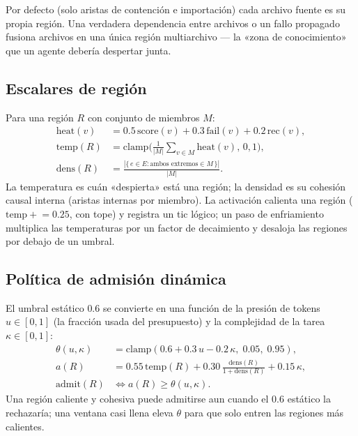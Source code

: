 \documentclass[11pt]{article}
\begin{document}
Por defecto (solo aristas de contención e importación) cada archivo fuente es su
propia región. Una verdadera dependencia entre archivos o un fallo propagado fusiona
archivos en una única región multiarchivo --- la «zona de conocimiento» que un agente
debería despertar junta.

\subsection{Escalares de región}

Para una región $R$ con conjunto de miembros $M$:
\begin{align}
\mathrm{heat}(v)        &= 0.5\,\mathrm{score}(v) + 0.3\,\mathrm{fail}(v) + 0.2\,\mathrm{rec}(v), \\
\mathrm{temp}(R)        &= \mathrm{clamp}\!\Big(\tfrac{1}{|M|}\textstyle\sum_{v\in M}\mathrm{heat}(v),\,0,1\Big), \label{eq:temp}\\
\mathrm{dens}(R)        &= \frac{|\{\,e\in E : \text{ambos extremos} \in M\,\}|}{|M|}. \label{eq:dens}
\end{align}
La temperatura es cuán «despierta» está una región; la densidad es su cohesión causal
interna (aristas internas por miembro). La activación calienta una región
($\mathrm{temp}\mathrel{+}=0.25$, con tope) y registra un tic lógico; un paso de
enfriamiento multiplica las temperaturas por un factor de decaimiento y desaloja las
regiones por debajo de un umbral.

\subsection{Política de admisión dinámica}\label{sec:policy}

El umbral estático $0.6$ se convierte en una función de la presión de tokens
$u\in[0,1]$ (la fracción usada del presupuesto) y la complejidad de la tarea
$\kappa\in[0,1]$:
\begin{align}
\theta(u,\kappa)       &= \mathrm{clamp}(0.6 + 0.3\,u - 0.2\,\kappa,\; 0.05,\; 0.95), \\
a(R)                   &= 0.55\,\mathrm{temp}(R) + 0.30\,\frac{\mathrm{dens}(R)}{1+\mathrm{dens}(R)} + 0.15\,\kappa, \\
\mathrm{admit}(R)      &\iff a(R) \ge \theta(u,\kappa).
\end{align}
Una región caliente y cohesiva puede admitirse aun cuando el $0.6$ estático la
rechazaría; una ventana casi llena eleva $\theta$ para que solo entren las regiones
más calientes.
\end{document}
